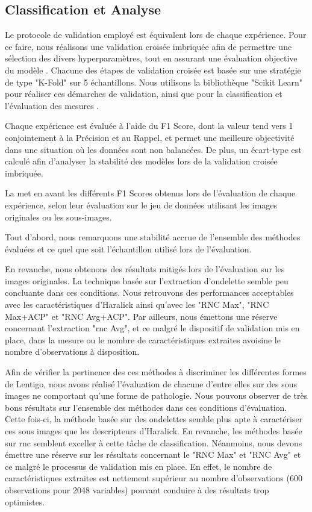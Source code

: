 \documentclass{gretsi}
\begin{document}
\begin{sloppypar}
\subsection{Classification et Analyse}
Le protocole de validation employé est équivalent lors de chaque expérience. Pour ce faire, nous réalisons une validation croisée imbriquée afin de permettre une sélection des divers hyperparamètres, tout en assurant une évaluation objective du modèle \cite{Cawley2010}. Chacune des étapes de validation croisée est basée sur une stratégie de type "K-Fold" sur 5 échantillons. Nous utilisons la bibliothèque "Scikit Learn" pour réaliser ces démarches de validation, ainsi que pour la classification et l’évaluation des mesures \cite{pedregosa2011scikit}.\par
Chaque expérience est évaluée à l'aide du F1 Score, dont la valeur tend vers 1 conjointement à la Précision et au Rappel, et permet une meilleure objectivité dans une situation où les données sont non balancées. De plus, un écart-type est calculé afin d'analyser la stabilité des modèles lors de la validation croisée imbriquée.\par
La  met en avant les différents F1 Scores obtenus lors de l'évaluation de chaque expérience, selon leur évaluation sur le jeu de données utilisant les images originales ou les sous-images.\par
Tout d'abord, nous remarquons une stabilité accrue de l'ensemble des méthodes évaluées et ce quel que soit l'échantillon utilisé lors de l'évaluation.\par
En revanche, nous obtenons des résultats mitigés lors de l'évaluation sur les images originales. La technique basée sur l'extraction d'ondelette semble peu concluante dans ces conditions. Nous retrouvons des performances acceptables avec les caractéristiques d'Haralick ainsi qu'avec les "RNC Max", "RNC Max\-+ACP" et "RNC Avg+ACP". Par ailleurs, nous émettons une réserve concernant l'extraction "\ac{rnc} Avg", et ce malgré le dispositif de validation mis en place, dans la mesure ou le nombre de caractéristiques extraites avoisine le nombre d'observations à disposition.\par
Afin de vérifier la pertinence des ces méthodes à discriminer les différentes formes de Lentigo, nous avons réalisé l'évaluation de chacune d'entre elles sur des sous images ne comportant qu'une forme de pathologie. Nous pouvons observer de très bons résultats sur l'ensemble des méthodes dans ces conditions d'évaluation. Cette fois-ci, la méthode basée sur des ondelettes semble plus apte à caractériser ces sous images que les descripteurs d'Haralick. En revanche, les méthodes basée sur \ac{rnc} semblent exceller à cette tâche de classification. Néanmoins, nous devons émettre une réserve sur les résultats concernant le "RNC Max" et "RNC Avg" et ce malgré le processus de validation mis en place. En effet, le nombre de caractéristiques extraites est nettement supérieur au nombre d'observations (600 observations pour 2048 variables) pouvant conduire à des résultats trop optimistes.\par


\end{sloppypar}
\end{document}
